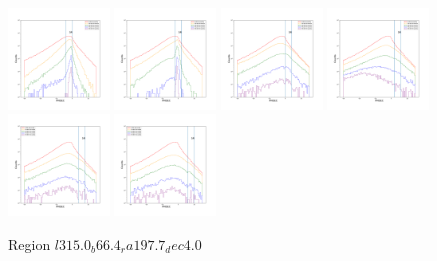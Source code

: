 \documentclass[12pt,prd]{article}
\begin{document}
\begin{figure}[h!]
\includegraphics[width=0.24\textwidth]{../figures/scanning_plotsgaiascan_l315_0_b66_4_ra197_7_dec4_0_npy_12.pdf}
\includegraphics[width=0.24\textwidth]{../figures/scanning_plotsgaiascan_l315_0_b66_4_ra197_7_dec4_0_npy_13.pdf}
\includegraphics[width=0.24\textwidth]{../figures/scanning_plotsgaiascan_l315_0_b66_4_ra197_7_dec4_0_npy_14.pdf}
\includegraphics[width=0.24\textwidth]{../figures/scanning_plotsgaiascan_l315_0_b66_4_ra197_7_dec4_0_npy_15.pdf}
\includegraphics[width=0.24\textwidth]{../figures/scanning_plotsgaiascan_l315_0_b66_4_ra197_7_dec4_0_npy_16.pdf}
\includegraphics[width=0.24\textwidth]{../figures/scanning_plotsgaiascan_l315_0_b66_4_ra197_7_dec4_0_npy_17.pdf}
\caption{Region $l315.0_b66.4_ra197.7_dec4.0$}
\end{figure}
\end{document}
